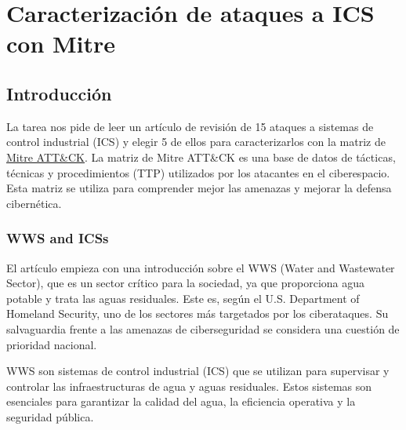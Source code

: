\chapter{Caracterización de ataques a ICS con Mitre}
\label{chap:01}
\section*{Introducción}

La tarea nos pide de leer un artículo de revisión de 15 ataques a sistemas de control industrial (ICS) y elegir 5 de ellos para caracterizarlos con la matriz de \href{attack.mitre.org/matrices/ics/}{Mitre ATT\&CK}. La matriz de Mitre ATT\&CK es una base de datos de tácticas, técnicas y procedimientos (TTP) utilizados por los atacantes en el ciberespacio. Esta matriz se utiliza para comprender mejor las amenazas y mejorar la defensa cibernética.


\subsection{WWS and ICSs}

El artículo empieza con una introducción sobre el WWS (Water and Wastewater Sector), que es un sector crítico para la sociedad, ya que proporciona agua potable y trata las aguas residuales. 
Este es, según el U.S. Department of Homeland Security, uno de los sectores más targetados por los ciberataques. Su salvaguardia frente a las amenazas de ciberseguridad se considera una cuestión de prioridad nacional.

WWS son sistemas de control industrial (ICS) que se utilizan para supervisar y controlar las infraestructuras de agua y aguas residuales. Estos sistemas son esenciales para garantizar la calidad del agua, la eficiencia operativa y la seguridad pública.

